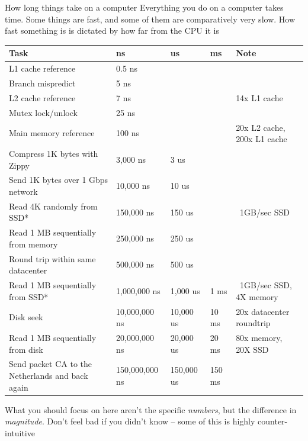 \documentclass{beamer}
\begin{document}
\begin{frame}{How long things take on a computer}
	Everything you do on a computer takes time. Some things are fast, and some of them are
	comparatively very slow. How fast something is is dictated by how far from the CPU
	it is
	{
	\tiny
			\begin{tabular}{lllll}
				Task & ns & us & ms & Note \\
				\hline
				L1 cache reference                &          0.5 ns &&& \\
				Branch mispredict                 &          5   ns &&& \\
				L2 cache reference                &          7   ns &&                   &14x L1 cache \\
				Mutex lock/unlock                 &         25   ns &&& \\
				Main memory reference             &        100   ns &&                   &20x L2 cache, 200x L1 cache \\
				Compress 1K bytes with Zippy      &      3,000   ns &      3 us&& \\
				Send 1K bytes over 1 Gbps network &     10,000   ns &     10 us&& \\
				Read 4K randomly from SSD*        &    150,000   ns &    150 us&         &~1GB/sec SSD \\
				Read 1 MB sequentially from memory&    250,000   ns &    250 us&& \\
				Round trip within same datacenter &    500,000   ns &    500 us&& \\
				Read 1 MB sequentially from SSD*  &  1,000,000   ns &  1,000 us  & 1 ms &~1GB/sec SSD, 4X memory \\
				Disk seek                         & 10,000,000   ns & 10,000 us  &10 ms &20x datacenter roundtrip \\
				Read 1 MB sequentially from disk  & 20,000,000   ns & 20,000 us  &20 ms &80x memory, 20X SSD \\
				Send packet CA to the Netherlands and back again & 150,000,000 ns & 150,000 us & 150 ms \\
				\hline
			\end{tabular}
		}
			What you should focus on here aren't the specific \emph{numbers}, but the difference in
	\emph{magnitude}. Don't feel bad if you didn't know -- some of this is highly counter-intuitive
\end{frame}
\end{document}
